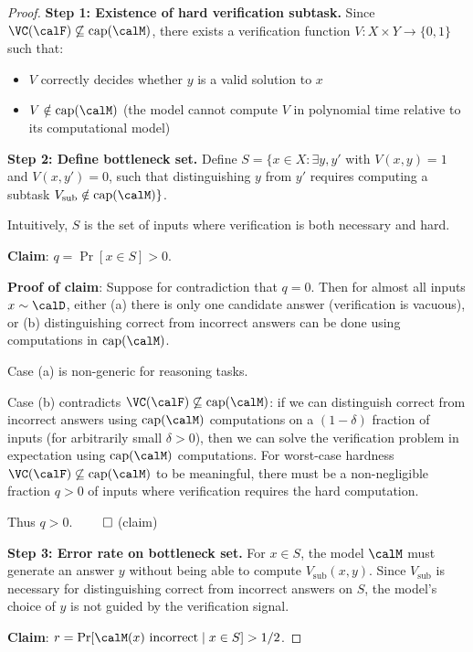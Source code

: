 \begin{proof}
\textbf{Step 1: Existence of hard verification subtask.}
Since $\VC(\calF) \not\subseteq \mathrm{cap}(\calM)$, there exists a verification function $V : X \times Y \to \{0,1\}$ such that:
\begin{itemize}
    \item $V$ correctly decides whether $y$ is a valid solution to $x$
    \item $V \notin \mathrm{cap}(\calM)$ (the model cannot compute $V$ in polynomial time relative to its computational model)
\end{itemize}

\textbf{Step 2: Define bottleneck set.}
Define $S = \{x \in X : \exists y, y'$ with $V(x, y) = 1$ and $V(x, y') = 0$, such that distinguishing $y$ from $y'$ requires computing a subtask $V_{\text{sub}} \notin \mathrm{cap}(\calM)\}$.

Intuitively, $S$ is the set of inputs where verification is both necessary and hard.

\textbf{Claim}: $q = \Pr[x \in S] > 0$.

\textbf{Proof of claim}:
Suppose for contradiction that $q = 0$. Then for almost all inputs $x \sim \calD$, either (a) there is only one candidate answer (verification is vacuous), or (b) distinguishing correct from incorrect answers can be done using computations in $\mathrm{cap}(\calM)$.

Case (a) is non-generic for reasoning tasks.

Case (b) contradicts $\VC(\calF) \not\subseteq \mathrm{cap}(\calM)$: if we can distinguish correct from incorrect answers using $\mathrm{cap}(\calM)$ computations on a $(1-\delta)$ fraction of inputs (for arbitrarily small $\delta > 0$), then we can solve the verification problem in expectation using $\mathrm{cap}(\calM)$ computations. For worst-case hardness $\VC(\calF) \not\subseteq \mathrm{cap}(\calM)$ to be meaningful, there must be a non-negligible fraction $q > 0$ of inputs where verification requires the hard computation.

Thus $q > 0$. $\qed$ (claim)

\textbf{Step 3: Error rate on bottleneck set.}
For $x \in S$, the model $\calM$ must generate an answer $y$ without being able to compute $V_{\text{sub}}(x, y)$. Since $V_{\text{sub}}$ is necessary for distinguishing correct from incorrect answers on $S$, the model's choice of $y$ is not guided by the verification signal.

\textbf{Claim}: $r = \Pr[\calM(x) \text{ incorrect} \mid x \in S] > 1/2$.


\end{proof}
